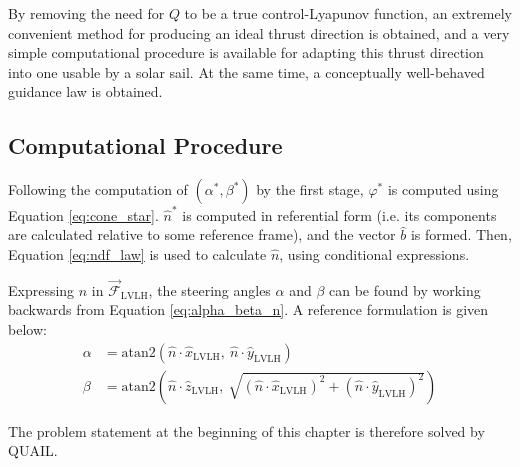 By removing the need for \(Q\) to be a true control-Lyapunov function, an extremely convenient method for producing an ideal thrust direction is obtained, and a very simple computational procedure is available for adapting this thrust direction into one usable by a solar sail. At the same time, a conceptually well-behaved guidance law is obtained.


\subsection{Computational Procedure}
Following the computation of \((\alpha^*, \beta^*)\) by the first stage, \(\varphi^*\) is computed using Equation \ref{eq:cone_star}. \(\hat{n}^*\) is computed in referential form (i.e. its components are calculated relative to some reference frame), and the vector \(\hat{b}\) is formed. Then, Equation \ref{eq:ndf_law} is used to calculate \(\hat{n}\), using conditional expressions.

Expressing \(\hat{n}\) in \(\vec{\mathcal{F}}_{\text{LVLH}}\), the steering angles \(\alpha\) and \(\beta\) can be found by working backwards from Equation \ref{eq:alpha_beta_n}. A reference formulation is given below:
\begin{align*}
    \alpha & = \mathrm{atan2}\left(\hat{n} \cdot \hat{x}_{\text{LVLH}}, \ \hat{n} \cdot \hat{y}_{\text{LVLH}}\right)                                                      \\
    \beta  & = \mathrm{atan2}\left(\hat{n} \cdot \hat{z}_{\text{LVLH}}, \ \sqrt{(\hat{n} \cdot \hat{x}_{\text{LVLH}})^2 + (\hat{n} \cdot \hat{y}_{\text{LVLH}})^2}\right)
\end{align*}

The problem statement at the beginning of this chapter is therefore solved by QUAIL.

